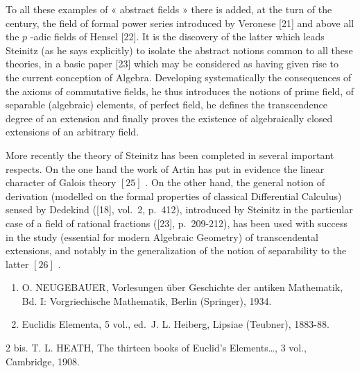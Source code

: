 To all these examples of « abstract fields » there is added, at the turn of the century, the field of formal power series introduced by Veronese {[}21{]} and above all the \(p\) -adic fields of Hensel {[}22{]}. It is the discovery of the latter which leads Steinitz (as he says explicitly) to isolate the abstract notions common to all these theories, in a basic paper {[}23{]} which may be considered as having given rise to the current conception of Algebra. Developing systematically the consequences of the axioms of commutative fields, he thus introduces the notions of prime field, of separable (algebraic) elements, of perfect field, he defines the transcendence degree of an extension and finally proves the existence of algebraically closed extensions of an arbitrary field.

More recently the theory of Steinitz has been completed in several important respects. On the one hand the work of Artin has put in evidence the linear character of Galois theory \([25]\) . On the other hand, the general notion of derivation (modelled on the formal properties of classical Differential Calculus) sensed by Dedekind ({[}18{]}, vol.~2, p.~412), introduced by Steinitz in the particular case of a field of rational fractions ({[}23{]}, p.~209-212), has been used with success in the study (essential for modern Algebraic Geometry) of transcendental extensions, and notably in the generalization of the notion of separability to the latter \([26]\) .


\begin{enumerate}
\def\labelenumi{\arabic{enumi}.}
\item
  O. NEUGEBAUER, Vorlesungen über Geschichte der antiken Mathematik, Bd. I: Vorgriechische Mathematik, Berlin (Springer), 1934.
\item
  Euclidis Elementa, 5 vol., ed.~J. L. Heiberg, Lipsiae (Teubner), 1883-88.
\end{enumerate}

2 bis. T. L. HEATH, The thirteen books of Euclid's Elements\ldots, 3 vol., Cambridge, 1908.

